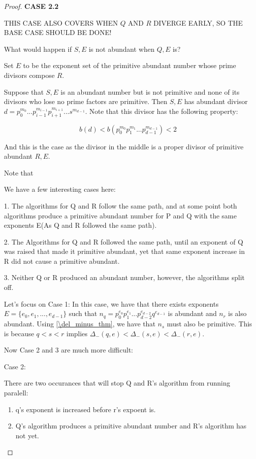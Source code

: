 \documentclass[../paper.tex]{subfiles}
\begin{document}
\begin{proof}
\textbf{CASE 2.2}

THIS CASE ALSO COVERS WHEN $Q$ AND $R$ DIVERGE EARLY, SO THE BASE
CASE SHOULD BE DONE!

What would happen if $S,E$ is not abundant when $Q,E$ is?

Set $E$ to be the exponent set of the primitive abundant number
whose prime divisors compose $R$.

Suppose that $S,E$ is an abundant number but is not primitive and
none of its divisors who lose no prime factors are primitive. Then
$S,E$ has abundant divisor $d = p_0^{m_0} ... p_{i-1}^{m_{i-1}}
p_{i+1}^{m_{i+1}} ... s^{m_{d-1}}$. Note that this divisor has the
following property:

$$b(d) < b(p_0^{m_0} p_1^{m_1} ... p_{d-1}^{m_{d-1}}) < 2$$

And this is the case as the divisor in the middle is a proper
divisor of primitive abundant $R,E$.


Note that



We have a few interesting cases here: 

  1. The algorithms for Q and R follow the same path, and at some
point both algorithms produce a primitive abundant number for P
and Q with the same exponents E(As Q and R followed the same
path).

  2. The Algorithms for Q and R followed the same path, until an
exponent of Q was raised that made it primitive abundant, yet that
same exponent increase in R did not cause a primitive abundant.

  3. Neither Q or R produced an abundant number, however, the
algorithms split off.

Let's focus on Case 1: In this case, we have that there exists
exponents $E = \{e_0, e_1, ..., e_{d-1}\}$ such that $n_q =
p_0^{e_0} p_1^{e_1} ... p_{d-2}^{e_{d-2}} q^{e_{d-1}}$ is abundant
and $n_r$ is also abundant. Using {\ref{\del_minus_thm}}, we have
that $n_s$ must also be primitive. This is because $q < s < r$
implies $\Delta_{-}(q,e) < \Delta_{-}(s,e) < \Delta_{-}(r,e)$.


Now Case 2 and 3 are much more difficult:

Case 2:


There are two occurances that will stop Q and R's algorithm from
running paralell:
\begin{enumerate}
  \item q's exponent is increased before r's expoent is.
  \item Q's algorithm produces a primitive abundant number and R's
algorithm has not yet.
\end{enumerate}


\end{proof}
\end{document}

